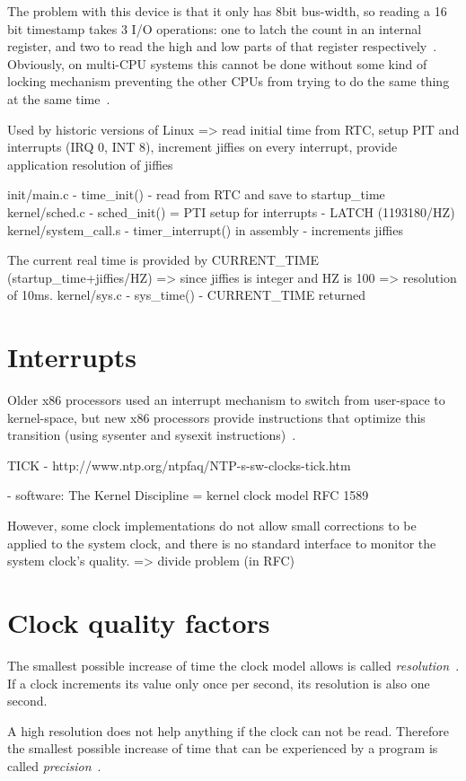 The problem with this device is that it only has
8bit bus-width, so reading a 16 bit timestamp takes
3 I/O operations: one to latch the count in an internal register,
and two to read the high and low parts
of that register respectively~\cite{timecounters}.
Obviously, on multi-CPU systems this cannot be
done without some kind of locking mechanism
preventing the other CPUs from trying to do the
same thing at the same time~\cite{timecounters}.


Used by historic versions of Linux
=> read initial time from RTC, setup PIT and interrupts (IRQ 0, INT 8), increment jiffies on every interrupt, provide application resolution of jiffies

init/main.c - time\_init() - read from RTC and save to startup\_time
kernel/sched.c - sched\_init() = PTI setup for interrupts - LATCH (1193180/HZ)
kernel/system\_call.s - timer\_interrupt() in assembly - increments jiffies

The current real time is provided by CURRENT\_TIME (startup\_time+jiffies/HZ) => since jiffies is integer and HZ is 100 => resolution of 10ms.
kernel/sys.c - sys\_time() - CURRENT\_TIME returned

\section{Interrupts}
Older x86 processors used an interrupt mechanism to switch from
user-space to kernel-space, but new x86 processors provide instructions
that optimize this transition (using sysenter and sysexit instructions)~\cite{ibm-linux-system-calls}.


TICK - http://www.ntp.org/ntpfaq/NTP-s-sw-clocks-tick.htm


- software:
The Kernel Discipline =  kernel clock model RFC 1589

However, some clock implementations do not allow small corrections to be applied to the system clock, and there is no standard interface to monitor the system clock's quality.
=> divide problem (in RFC)

\section{Clock quality factors}
The smallest possible increase of time the clock model allows is called {\it{resolution}}~\cite{ntp-faq}.
If a clock increments its value only once per second, its resolution is also one second.

A high resolution does not help anything if the clock can not be read.
Therefore the smallest possible increase of time that can be experienced
by a program is called {\it{precision}}~\cite{ntp-faq}.

